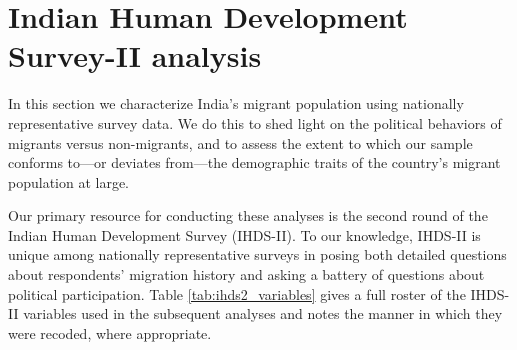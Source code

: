 \documentclass[
  11.5pt,
]{article}
\begin{document}
\begin{table}[!h]

\caption{\label{tab:unnamed-chunk-13}Average voter turnout rates by natives versus naturalized immigrants, according to the sixth wave of the World Values Survey (2010-14). Turnout percentages are calculated using data from all countries where responses to two questions were gathered: ``Respondent immigrant?'' (1 = yes; 0 = no), and ``Vote in elections?'' (1 = always/usually; 0 otherwise). Included countries are: Algeria, Azerbaijan, Argentina, Armenia, Brazil, Belarus, Chile, Taiwan, Colombia, Cyprus, Estonia, Georgia, Germany, Ghana, Haiti, India, Iraq, Kazakhstan, Jordan, South Korea, Kyrgyzstan, Lebanon, Libya, Malaysia, Mexico, Morocco, Netherlands, New Zealand, Nigeria, Pakistan, Peru, Philippines, Poland, Qatar, Romania, Russia, Rwanda, Singapore, Slovenia, South Africa, Zimbabwe, Sweden, Thailand, Trinidad and Tobago, Tunisia, Turkey, Ukraine, Egypt, United States, Uruguay, Uzbekistan, and Yemen.}
\centering
{}
\end{table}

\section{Indian Human Development Survey-II analysis}

In this section we characterize India's migrant population using
nationally representative survey data. We do this to shed light on the
political behaviors of migrants versus non-migrants, and to assess the
extent to which our sample conforms to---or deviates from---the
demographic traits of the country's migrant population at large.

Our primary resource for conducting these analyses is the second round
of the Indian Human Development Survey (IHDS-II). To our knowledge,
IHDS-II is unique among nationally representative surveys in posing both
detailed questions about respondents' migration history and asking a
battery of questions about political participation. Table
\ref{tab:ihds2_variables} gives a full roster of the IHDS-II variables
used in the subsequent analyses and notes the manner in which they were
recoded, where appropriate.
\end{document}
